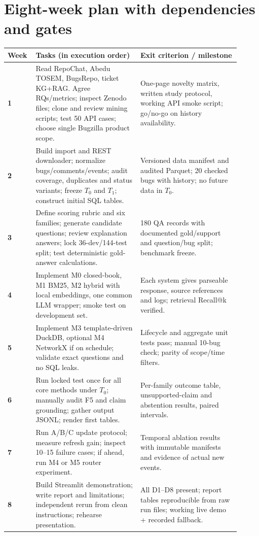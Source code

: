 \documentclass[11pt,a4paper]{article}
\begin{document}
\section{Eight-week plan with dependencies and gates}
\begin{longtable}{@{}p{0.09\linewidth}p{0.42\linewidth}p{0.40\linewidth}@{}}\toprule
\textbf{Week}&\textbf{Tasks (in execution order)}&\textbf{Exit criterion / milestone}\\\midrule\endhead
\textbf{1}&Read RepoChat, Abedu TOSEM, BugsRepo, ticket KG+RAG. Agree RQs/metrics; inspect Zenodo files; clone and review mining scripts; test 50 API cases; choose single Bugzilla product scope.&One-page novelty matrix, written study protocol, working API smoke script; go/no-go on history availability.\\
\textbf{2}&Build import and REST downloader; normalize bugs/comments/events; audit coverage, duplicates and status variants; freeze $T_0$ and $T_1$; construct initial SQL tables.&Versioned data manifest and audited Parquet; 20 checked bugs with history; no future data in $T_0$.\\
\textbf{3}&Define scoring rubric and six families; generate candidate questions; review explanation answers; lock 36-dev/144-test split; test deterministic gold-answer calculations.&180 QA records with documented gold/support and question/bug split; benchmark freeze.\\
\textbf{4}&Implement M0 closed-book, M1 BM25, M2 hybrid with local embeddings, one common LLM wrapper; smoke test on development set.&Each system gives parseable response, source references and logs; retrieval Recall@k verified.\\
\textbf{5}&Implement M3 template-driven DuckDB, optional M4 NetworkX if on schedule; validate exact questions and no SQL leaks.&Lifecycle and aggregate unit tests pass; manual 10-bug check; parity of scope/time filters.\\
\textbf{6}&Run locked test once for all core methods under $T_0$; manually audit F5 and claim grounding; gather output JSONL; render first tables.&Per-family outcome table, unsupported-claim and abstention results, paired intervals.\\
\textbf{7}&Run A/B/C update protocol; measure refresh gain; inspect 10--15 failure cases; if ahead, run M4 or M5 router experiment.&Temporal ablation results with immutable manifests and evidence of actual new events.\\
\textbf{8}&Build Streamlit demonstration; write report and limitations; independent rerun from clean instructions; rehearse presentation.&All D1--D8 present; report tables reproducible from raw run files; working live demo + recorded fallback.\\\bottomrule
\end{longtable}
\end{document}
